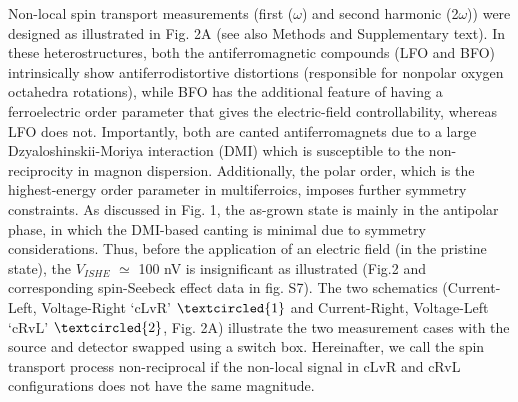 \documentclass[12pt]{article}
\begin{document}
Non-local spin transport measurements (first ($\omega$) and second harmonic (2$\omega$)) were designed as illustrated in Fig. 2A (see also Methods and Supplementary text). 
In these heterostructures, both the antiferromagnetic compounds (LFO and BFO) intrinsically show antiferrodistortive distortions\cite{Nicola2012noncollinear} (responsible for nonpolar oxygen octahedra rotations), while BFO has the additional feature of having a ferroelectric order parameter that gives the electric-field controllability, whereas LFO does not. Importantly, both are canted antiferromagnets due to a large Dzyaloshinskii-Moriya interaction (DMI) which is susceptible to the non-reciprocity in magnon dispersion\cite{cheong2018broken,albrecht2010ferromagnetism}. Additionally, the polar order, which is the highest-energy order parameter in multiferroics, imposes further symmetry constraints\cite{dong2019magnetoelectricity}. As discussed in Fig. 1, the as-grown state is mainly in the antipolar phase, in which the DMI-based canting is minimal due to symmetry considerations\cite{bertaut1968representation}. Thus, before the application of an electric field (in the pristine state), the $V_{ISHE}$ $\simeq$ 100 nV is insignificant as illustrated (Fig.2 and corresponding spin-Seebeck effect data in fig. S7). The two schematics (Current-Left, Voltage-Right `cLvR' $\textcircled{1}$ and Current-Right, Voltage-Left `cRvL' $\textcircled{2}$, Fig. 2A) illustrate the two measurement cases with the source and detector swapped using a switch box. Hereinafter, we call the spin transport process non-reciprocal if the non-local signal in cLvR and cRvL configurations does not have the same magnitude.  
\end{document}

